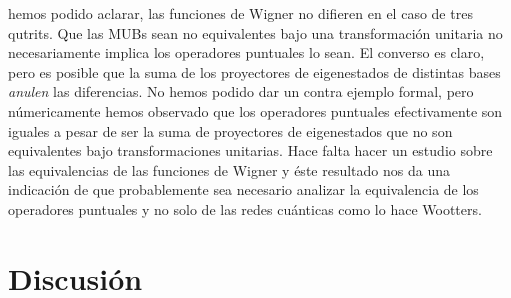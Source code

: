 \documentclass[a4paper]{report}
\begin{document}
  hemos podido aclarar, las funciones de Wigner no difieren
  en el caso de tres qutrits. Que las MUBs sean no
  equivalentes bajo una transformación unitaria no
  necesariamente implica los operadores puntuales lo sean.
  El converso es claro, pero es posible que la suma de los
  proyectores de eigenestados de distintas bases
  \textit{anulen} las diferencias. No hemos podido dar un
  contra ejemplo formal, pero númericamente hemos observado
  que los operadores puntuales efectivamente son iguales a
  pesar de ser la suma de proyectores de eigenestados que no
  son equivalentes bajo transformaciones unitarias. Hace
  falta hacer un estudio sobre las equivalencias de las
  funciones de Wigner y éste resultado nos da una indicación
  de que probablemente sea necesario analizar la
  equivalencia de los operadores puntuales y no solo de las
  redes cuánticas como lo hace Wootters.

  \clearpage
  \section{Discusión}
\end{document}
